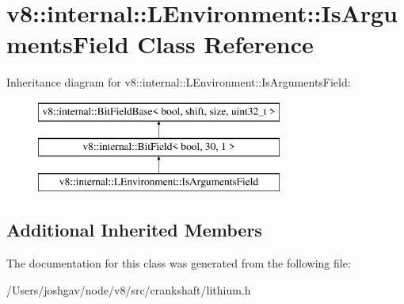 \hypertarget{classv8_1_1internal_1_1_l_environment_1_1_is_arguments_field}{}\section{v8\+:\+:internal\+:\+:L\+Environment\+:\+:Is\+Arguments\+Field Class Reference}
\label{classv8_1_1internal_1_1_l_environment_1_1_is_arguments_field}
Inheritance diagram for v8\+:\+:internal\+:\+:L\+Environment\+:\+:Is\+Arguments\+Field\+:\begin{figure}[H]
\begin{center}
\leavevmode
\includegraphics[height=3.000000cm]{classv8_1_1internal_1_1_l_environment_1_1_is_arguments_field}
\end{center}
\end{figure}
\subsection*{Additional Inherited Members}


The documentation for this class was generated from the following file\+:\begin{DoxyCompactItemize}
\item 
/\+Users/joshgav/node/v8/src/crankshaft/lithium.\+h\end{DoxyCompactItemize}
